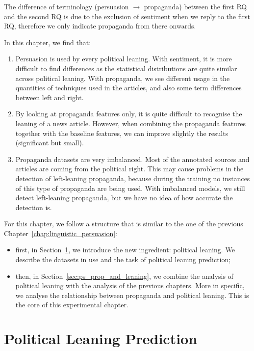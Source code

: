 The difference of terminology (persuasion $\rightarrow$ propaganda) between the first RQ and the second RQ is due to the exclusion of sentiment when we reply to the first RQ, therefore we only indicate propaganda from there onwards.

In this chapter, we find that:
\begin{enumerate}
    \item Persuasion is used by every political leaning. With sentiment, it is more difficult to find differences as the statistical distributions are quite similar across political leaning. With propaganda, we see different usage in the quantities of techniques used in the articles, and also some term differences between left and right.
    \item By looking at propaganda features only, it is quite difficult to recognise the leaning of a news article. However, when combining the propaganda features together with the baseline features, we can improve slightly the results (significant but small).
    \item Propaganda datasets are very imbalanced. Most of the annotated sources and articles are coming from the political right. This may cause problems in the detection of left-leaning propaganda, because during the training no instances of this type of propaganda are being used. With imbalanced models, we still detect left-leaning propaganda, but we have no idea of how accurate the detection is.
\end{enumerate}

For this chapter, we follow a structure that is similar to the one of the previous Chapter~\ref{chap:linguistic_persuasion}:
\begin{itemize}
    \item first, in Section~\ref{sec:ps_political_sides}, we introduce the new ingredient: political leaning. We describe the datasets in use and the task of political leaning prediction;
    \item then, in Section~\ref{sec:ps_prop_and_leaning}, we combine the analysis of political leaning with the analysis of the previous chapters. More in specific, we analyse the relationship between propaganda and political leaning. This is the core of this experimental chapter.
\end{itemize}


\section{\statusred Political Leaning Prediction}
\label{sec:ps_political_sides}

